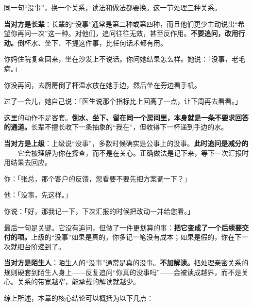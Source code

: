 同一句“没事”，换一个关系，读法和做法都要换。这一节处理三种关系。

\textbf{当对方是长辈}：长辈的“没事”通常是第二种或第四种，而且他们更少主动说出“希望你再问一次”这一种。对他们，追问往往无效，甚至反作用。\textbf{不要追问，改用行动。}倒杯水、坐下、不提这件事，比任何话术都有用。

\par
\begin{mdquote}
你妈住院复查回来，坐在沙发上不说话。你问她结果怎么样。她说：「没事，老毛病。」\par
\vspace{0.3\baselineskip}
你没再问，去厨房倒了杯温水放在她手边，然后坐在旁边看手机。\par
\vspace{0.3\baselineskip}
过了一会儿，她自己说：「医生说那个指标比上回高了一点，让下周再去看看。」\par
\end{mdquote}

这里的动作不是客套。\textbf{倒水、坐下、留在同一个房间里，本身就是一条不要求回答的通道。}长辈不擅长收下一条抽象的“我在”，但收得下一杯递到手边的水。

\textbf{当对方是上级}：上级说“没事”，多数时候确实是公事上的没事。\textbf{此时追问是减分的}——它会被理解为你在探查，而不是在关心。正确做法是记下来，等下一次汇报时用结果去回应。

\begin{mdquote}
你：「张总，那个客户的反馈，您看要不要先把方案调一下？」\par
他：「没事，先这样。」\par
你说：「好，那我记一下，下次汇报的时候把改动一并给您看。」\par
\end{mdquote}

最后一句是关键。它没有追问，但做了一件更划算的事：\textbf{把它变成了一个后续要交付的项。}上级的“没事”如果是真的，你多记一笔没有成本；如果是假的，你在下一次就把台阶递到了。

\textbf{当对方是陌生人}：陌生人的“没事”通常是真的没事。\textbf{不加解读。}把处理亲密关系的规则硬套到陌生人身上——反复追问“你真的没事吗”——会被读成越界，而不是关心。关系的带宽越窄，能承载的解读就越少。

\hcirule


综上所述，本章的核心结论可以概括为以下几点：

